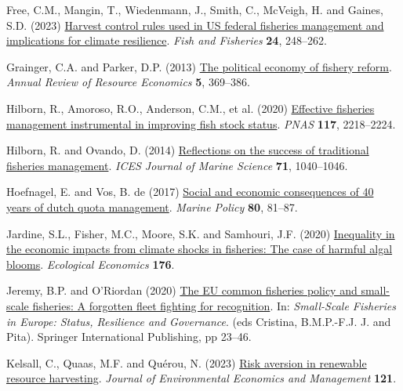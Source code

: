 \documentclass[
  letterpaper,
  DIV=11,
  numbers=noendperiod]{scrartcl}
\newlength{\cslhangindent}
\newlength{\cslentryspacingunit} %
\newenvironment{CSLReferences}[2] %
 {%
  \setlength{\parindent}{0pt}
  \ifodd #1
  \let\oldpar\par
  \def\par{\hangindent=\cslhangindent\oldpar}
  \fi
  \setlength{\parskip}{#2\cslentryspacingunit}
 }%
 {}
\begin{document}
\begin{CSLReferences}{1}{0}
\leavevmode{}%
Free, C.M., Mangin, T., Wiedenmann, J., Smith, C., McVeigh, H. and
Gaines, S.D. (2023) \href{https://doi.org/10.1111/faf.12724}{Harvest
control rules used in US federal fisheries management and implications
for climate resilience}. \emph{Fish and Fisheries} \textbf{24},
248--262.

\leavevmode{}%
Grainger, C.A. and Parker, D.P. (2013)
\href{https://doi.org/10.1146/annurev-resource-091912-151838}{The
political economy of fishery reform}. \emph{Annual Review of Resource
Economics} \textbf{5}, 369--386.

\leavevmode{}%
Hilborn, R., Amoroso, R.O., Anderson, C.M., et al. (2020)
\href{https://doi.org/10.1073/pnas.1909726116/-/DCSupplemental}{Effective
fisheries management instrumental in improving fish stock status}.
\emph{PNAS} \textbf{117}, 2218--2224.

\leavevmode{}%
Hilborn, R. and Ovando, D. (2014)
\href{https://doi.org/10.1093/icesjms/fsu034}{Reflections on the success
of traditional fisheries management}. \emph{ICES Journal of Marine
Science} \textbf{71}, 1040--1046.

\leavevmode{}%
Hoefnagel, E. and Vos, B. de (2017)
\href{https://doi.org/10.1016/j.marpol.2016.09.019}{Social and economic
consequences of 40 years of dutch quota management}. \emph{Marine
Policy} \textbf{80}, 81--87.

\leavevmode{}%
Jardine, S.L., Fisher, M.C., Moore, S.K. and Samhouri, J.F. (2020)
\href{https://doi.org/10.1016/j.ecolecon.2020.106691}{Inequality in the
economic impacts from climate shocks in fisheries: The case of harmful
algal blooms}. \emph{Ecological Economics} \textbf{176}.

\leavevmode{}%
Jeremy, B.P. and O'Riordan (2020)
\href{https://doi.org/10.1007/978-3-030-37371-9_2}{The EU common
fisheries policy and small-scale fisheries: A forgotten fleet fighting
for recognition}. In: \emph{Small-Scale Fisheries in Europe: Status,
Resilience and Governance}. (eds Cristina, B.M.P.-F.J. J. and Pita).
Springer International Publishing, pp 23--46.

\leavevmode{}%
Kelsall, C., Quaas, M.F. and Quérou, N. (2023)
\href{https://doi.org/10.1016/j.jeem.2023.102855}{Risk aversion in
renewable resource harvesting}. \emph{Journal of Environmental Economics
and Management} \textbf{121}.


\end{CSLReferences}
\end{document}

